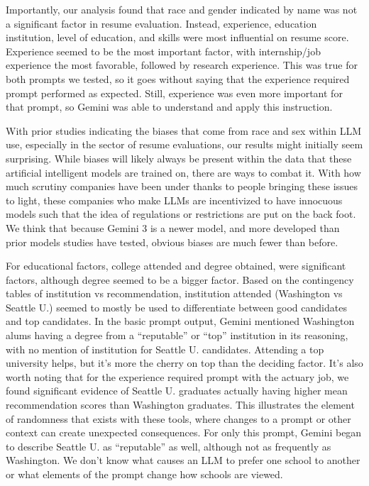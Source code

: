\documentclass[11pt,letterpaper]{article}
\begin{document}
Importantly, our analysis found that race and gender indicated by name was not a significant factor in resume evaluation. Instead, experience, education institution, level of education, and skills were most influential on resume score. Experience seemed to be the most important factor, with internship/job experience the most favorable, followed by research experience. This was true for both prompts we tested, so it goes without saying that the experience required prompt performed as expected. Still, experience was even more important for that prompt, so Gemini was able to understand and apply this instruction.
 
With prior studies indicating the biases that come from race and sex within LLM use, especially in the sector of resume evaluations, our results might initially seem surprising. While biases will likely always be present within the data that these artificial intelligent models are trained on, there are ways to combat it. With how much scrutiny companies have been under thanks to people bringing these issues to light, these companies who make LLMs are incentivized to have innocuous models such that the idea of regulations or restrictions are put on the back foot. We think that because Gemini 3 is a newer model, and more developed than prior models studies have tested, obvious biases are much fewer than before.

For educational factors, college attended and degree obtained, were significant factors, although degree seemed to be a bigger factor. Based on the contingency tables of institution vs recommendation, institution attended (Washington vs Seattle U.) seemed to mostly be used to differentiate between good candidates and top candidates. In the basic prompt output, Gemini mentioned Washington alums having a degree from a ``reputable'' or ``top'' \cite{gemini} institution in its reasoning, with no mention of institution for Seattle U. candidates. Attending a top university helps, but it's more the cherry on top than the deciding factor. It's also worth noting that for the experience required prompt with the actuary job, we found significant evidence of Seattle U. graduates actually having higher mean recommendation scores than Washington graduates. This illustrates the element of randomness that exists with these tools, where changes to a prompt or other context can create unexpected consequences. For only this prompt, Gemini began to describe Seattle U. as ``reputable'' as well, although not as frequently as Washington. We don't know what causes an LLM to prefer one school to another or what elements of the prompt change how schools are viewed.  
\end{document}
